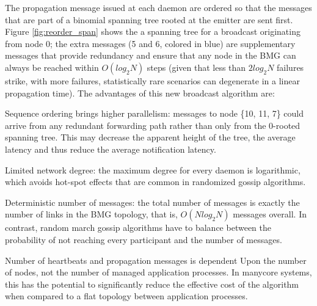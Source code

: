 \documentclass[sigconf]{acmart}
\begin{document}
The propagation message issued at each daemon are ordered so that the
messages that are part of a binomial spanning tree rooted at the emitter
are sent first. Figure \ref{fig:reorder_span} shows the a spanning tree
for a broadcast originating from node 0; the extra messages (5 and 6, colored
in blue) are supplementary messages that provide redundancy and ensure that
any node in the BMG can always be reached within $O(log_2 N)$ steps (given
that less than $2 log_2 N$ failures strike, with more failures,
statistically rare scenarios can degenerate in a linear propagation time).
The advantages of this new broadcast algorithm are:
\begin{compactenum}
  \item Sequence ordering brings higher parallelism: messages to node \{10, 11, 7\} could arrive from any redundant forwarding path rather than only from the 0-rooted spanning tree. This may decrease the apparent height of the tree, the average latency and thus reduce the average notification latency.
  \item Limited network degree: the maximum degree for every daemon is logarithmic, which avoids hot-spot effects that are common in randomized gossip algorithms.
  \item Deterministic number of messages: the total number of messages is
  exactly the number of links in the BMG topology, that is, $O(N log_2 N)$
  messages overall. In contrast, random march gossip algorithms have to
  balance between the probability of not reaching every participant and 
  the number of messages.
  \item Number of heartbeats and propagation messages is dependent Upon
  the number of nodes, not the number of managed application processes.
  In manycore systems, this has the potential to significantly reduce the
  effective cost of the algorithm when compared to a flat topology between
  application processes.
\end{compactenum}
\end{document}
